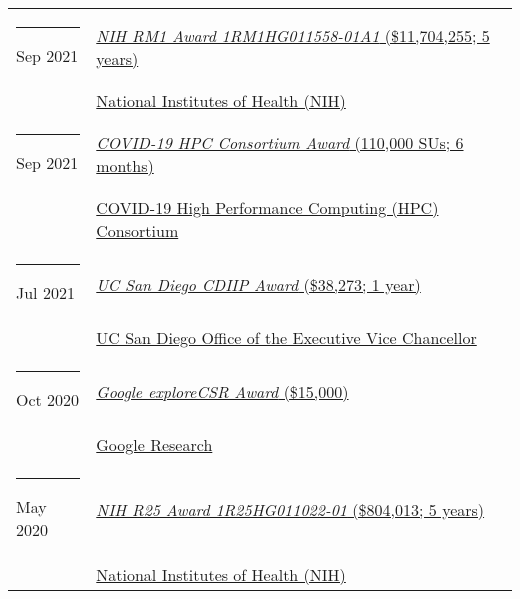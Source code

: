 \documentclass[margin,line]{res}
\begin{document}
\begin{resume}
\begin{longtable}{@{}p{0.7in}p{4in}}
\hspace*{-4mm} \rule{-1mm}{5mm} Sep 2021 & \href{https://reporter.nih.gov/project-details/10307040}{\textit{NIH RM1 Award 1RM1HG011558-01A1} (\$11,704,255; 5 years)}\\*
\hspace*{-4mm} \hspace*{-4mm} & \hspace{4mm} \href{https://nih.gov}{National Institutes of Health (NIH)}\\
\hspace*{-4mm} \rule{-1mm}{5mm} Sep 2021 & \href{https://www.xsede.org/covid19-hpc-consortium}{\textit{COVID-19 HPC Consortium Award} (110,000 SUs; 6 months)}\\*
\hspace*{-4mm} \hspace*{-4mm} & \hspace{4mm} \href{https://covid19-hpc-consortium.org/}{COVID-19 High Performance Computing (HPC) Consortium}\\
\hspace*{-4mm} \rule{-1mm}{5mm} Jul 2021 & \href{https://academicaffairs.ucsd.edu/evc/cdiip.html}{\textit{UC San Diego CDIIP Award} (\$38,273; 1 year)}\\*
\hspace*{-4mm} \hspace*{-4mm} & \hspace{4mm} \href{https://academicaffairs.ucsd.edu/evc/cdiip.html}{UC San Diego Office of the Executive Vice Chancellor}\\
\hspace*{-4mm} \rule{-1mm}{5mm} Oct 2020 & \href{https://research.google/outreach/explore-csr/recipients/?category=2020}{\textit{Google exploreCSR Award} (\$15,000)}\\*
\hspace*{-4mm} \hspace*{-4mm} & \hspace{4mm} \href{https://research.google/}{Google Research}\\
\hspace*{-4mm} \rule{-1mm}{5mm} May 2020 & \href{https://reporter.nih.gov/project-details/9935824}{\textit{NIH R25 Award 1R25HG011022-01} (\$804,013; 5 years)}\\*
\hspace*{-4mm} \hspace*{-4mm} & \hspace{4mm} \href{https://nih.gov}{National Institutes of Health (NIH)}\\

\end{longtable}
\end{resume}
\end{document}
